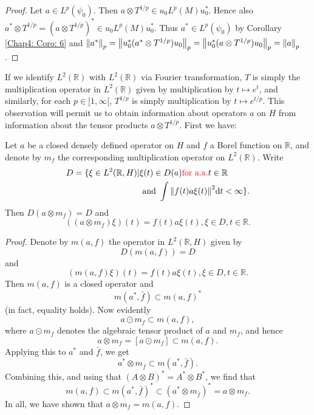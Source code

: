 \begin{proof}
    Let $a\in L^p(\psi_0)$. Then $a\otimes T^{1/p}\in u_0L^p(M)u_0^*$. Hence also $a^*\otimes T^{1/p}=(a\otimes T^{1/p})^*\in u_0 L^p(M)u_0^*$. Thus $a^*\in L^p(\psi_0)$ by Corollary \ref{Chap4: Coro: 6} and $\norm{a^*}_p = \norm{u_0^*(a^*\otimes T^{1/p})u_0}_p=\norm{u_0^*(a\otimes T^{1/p})u_0}_p=\norm{a}_p$.
\end{proof}
If we identify $L^2(\mathbb{R})$ with $L^2(\mathbb{R})$ via Fourier transformation, $T$ is simply the multiplication operator in $L^2(\mathbb{R})$ given by multiplication by $t\mapsto e^t$, and similarly, for each $p\in [1,\infty[$, $T^{1/p}$ is simply multiplication by $t\mapsto e^{t/p}$. This observation will permit us to obtain information about operators $a$ on $H$ from information about the tensor products $a\otimes T^{1/p}$. First we have:
\begin{lemma}\label{Chap4: Lemma: 9}
    Let $a$ be a closed densely defined operator on $H$ and $f$ a Borel function on $\mathbb{R}$, and denote by $m_f$ the corresponding multiplication operator on $L^2(\mathbb{R})$. Write
    \[
        \begin{split}
            D = \{\xi\in L^2(\mathbb{R},H)|&\xi(t)\in D(a) \text{{\color{red} for  a.a.}} t\in \mathbb{R}\\
            &\text{ and }\int \norm{f(t)a\xi(t)}^2\dd t <\infty\}.
        \end{split}
    \]
    Then $D(a\otimes m_f)=D$ and
    \[
        ((a\otimes m_f)\xi)(t)=f(t)a\xi(t),\xi\in D,t\in \mathbb{R}.
    \]
\end{lemma}
\begin{proof}
    Denote by $m(a,f)$ the operator in $L^2(\mathbb{R},H)$ given by
    \[
        D(m(a,f)) = D
    \]
    and
    \[
        (m(a,f)\xi)(t)=f(t)a\xi(t), \xi\in D, t\in \mathbb{R}.
    \]
    Then $m(a,f)$ is a closed operator and
    \[
        m(a^*,\bar{f})\subset m(a,f)^*
    \]
    (in fact, equality holds). Now evidently
    \[
        a\odot m_f\subset m(a,f),
    \]
    where $a\odot m_f$ denotes the algebraic tensor product of $a$ and $m_f$, and hence
    \[
        a\otimes m_f=[a\odot m_f]\subset m(a,f).
    \]
    Applying this to $a^*$ and $\bar{f}$, we get
    \[
        a^*\otimes m_{\bar{f}}\subset m(a^*,\bar{f}).
    \]
    Combining this, and using that $(A\otimes B)^*=A^*\otimes B^*$, we find that
    \[
        m(a,f)\subset m(a^*,\bar{f})^*\subset (a^*\otimes m_{\bar{f}})^*=a\otimes m_f.
    \]
    In all, we have shown that $a\otimes m_f=m(a,f)$.
\end{proof}
